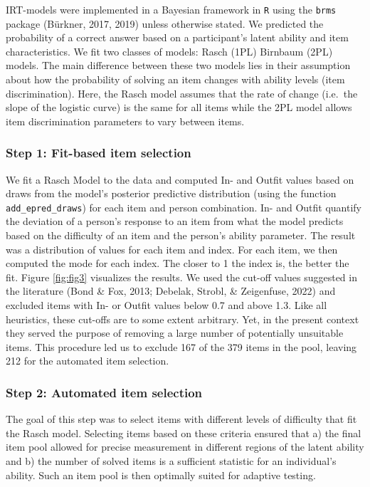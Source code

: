 \documentclass[
  man,floatsintext]{apa6}
\begin{document}
IRT-models were implemented in a Bayesian framework in \texttt{R} using the \texttt{brms} package (Bürkner, 2017, 2019) unless otherwise stated. We predicted the probability of a correct answer based on a participant's latent ability and item characteristics. We fit two classes of models: Rasch (1PL) Birnbaum (2PL) models. The main difference between these two models lies in their assumption about how the probability of solving an item changes with ability levels (item discrimination). Here, the Rasch model assumes that the rate of change (i.e.~the slope of the logistic curve) is the same for all items while the 2PL model allows item discrimination parameters to vary between items.

\hypertarget{step-1-fit-based-item-selection}{%
\subsubsection{Step 1: Fit-based item selection}\label{step-1-fit-based-item-selection}}

We fit a Rasch Model to the data and computed In- and Outfit values based on draws from the model's posterior predictive distribution (using the function \texttt{add\_epred\_draws}) for each item and person combination. In- and Outfit quantify the deviation of a person's response to an item from what the model predicts based on the difficulty of an item and the person's ability parameter. The result was a distribution of values for each item and index. For each item, we then computed the mode for each index. The closer to 1 the index is, the better the fit. Figure \ref{fig:fig3} visualizes the results. We used the cut-off values suggested in the literature (Bond \& Fox, 2013; Debelak, Strobl, \& Zeigenfuse, 2022) and excluded items with In- or Outfit values below 0.7 and above 1.3. Like all heuristics, these cut-offs are to some extent arbitrary. Yet, in the present context they served the purpose of removing a large number of potentially unsuitable items. This procedure led us to exclude 167 of the 379 items in the pool, leaving 212 for the automated item selection.

\hypertarget{step-2-automated-item-selection}{%
\subsubsection{Step 2: Automated item selection}\label{step-2-automated-item-selection}}

The goal of this step was to select items with different levels of difficulty that fit the Rasch model. Selecting items based on these criteria ensured that a) the final item pool allowed for precise measurement in different regions of the latent ability and b) the number of solved items is a sufficient statistic for an individual's ability. Such an item pool is then optimally suited for adaptive testing.
\end{document}
